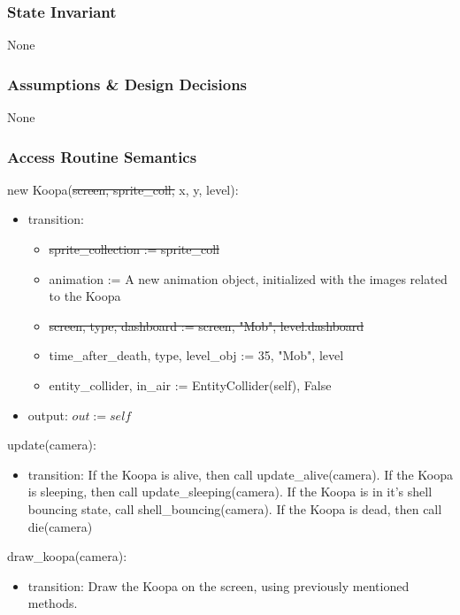 \documentclass[12pt]{article}
\begin{document}
\subsubsection* {State Invariant}

None

\subsubsection* {Assumptions \& Design Decisions}

None

\subsubsection* {Access Routine Semantics}

new Koopa(\st{screen, sprite\_coll, }x, y, level):
\begin{itemize}
    \item transition: 
    \begin{itemize}[]
        \item \st{sprite\_collection := sprite\_coll}
        \item animation := A new animation object, initialized with the images related to the Koopa
        \item \st{screen, type, dashboard := screen, "Mob", level.dashboard}
        \item \color{red} time\_after\_death, type, level\_obj := 35, "Mob", level
        \item \color{red} entity\_collider, in\_air := EntityCollider(self), False
    \end{itemize}
    \item output: $out := self$
\end{itemize}

update(camera):
\begin{itemize}
    \item transition: If the Koopa is alive, then call update\_alive(camera). If the Koopa is sleeping, then call update\_sleeping(camera). If the Koopa is in it's shell bouncing state, call shell\_bouncing(camera). If the Koopa is dead, then call die(camera)
\end{itemize}

draw\_koopa(camera):
\begin{itemize}
    \item transition: Draw the Koopa on the screen, using previously mentioned methods.
\end{itemize}
\end{document}
